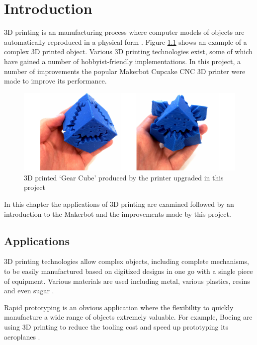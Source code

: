\chapter{Introduction}
	
	3D printing is an manufacturing process where computer models of objects are
	automatically reproduced in a physical form \cite{additivemanufacturing}.
	Figure \ref{fig:gearCube} shows an example of a complex 3D printed object.
	Various 3D printing technologies exist, some of which have gained a number of
	hobbyist-friendly implementations. In this project, a number of improvements
	the popular Makerbot Cupcake CNC 3D printer were made to improve its
	performance.
	
	\begin{figure}
		\includegraphics[width=1\textwidth]{diagrams/gearCube.pdf}
		\caption{3D printed `Gear Cube' produced by the printer upgraded in this
		project}
		\label{fig:gearCube}
	\end{figure}
	
	In this chapter the applications of 3D printing are examined followed by an
	introduction to the Makerbot and the improvements made by this project.
	
	\section{Applications}
		
		3D printing technologies allow complex objects, including complete
		mechanisms, to be easily manufactured based on digitized designs in one go
		with a single piece of equipment. Various materials are used including
		metal, various plastics, resins and even sugar \cite{candyfab}.
		
		Rapid prototyping is an obvious application where the flexibility to quickly
		manufacture a wide range of objects extremely valuable. For example, Boeing
		are using 3D printing to reduce the tooling cost and speed up prototyping
		its aeroplanes \cite{boeing3dprint}.
		
